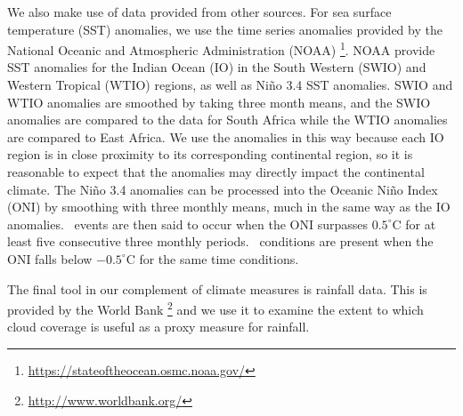 We also make use of data provided from other sources. For sea surface
temperature (SST) anomalies, we use the time series anomalies provided
by the National Oceanic and Atmospheric Administration
(NOAA) \footnote{\url{https://stateoftheocean.osmc.noaa.gov/}}. NOAA
provide SST anomalies for the Indian Ocean (IO) in the South Western
(SWIO) and Western Tropical (WTIO) regions, as well as Ni{\~n}o 3.4
SST anomalies. SWIO and WTIO anomalies are smoothed by taking three
month means, and the SWIO anomalies are compared to the data for South
Africa while the WTIO anomalies are compared to East Africa. We use
the anomalies in this way because each IO region is in close proximity
to its corresponding continental region, so it is reasonable to expect
that the anomalies may directly impact the continental climate. The
Ni{\~n}o 3.4 anomalies can be processed into the Oceanic Ni{\~n}o
Index (ONI) by smoothing with three monthly means, much in the same
way as the IO anomalies. \elnino\ events are then said to occur when
the ONI surpasses $0.5^{\circ}$C for at least five consecutive three
monthly periods. \nina\ conditions are present when the ONI falls
below $-0.5^{\circ}$C for the same time conditions.

The final tool in our complement of climate measures is rainfall
data. This is provided by the World
Bank \footnote{\url{http://www.worldbank.org/}} and we use it to
examine the extent to which cloud coverage is useful as a proxy
measure for rainfall.
